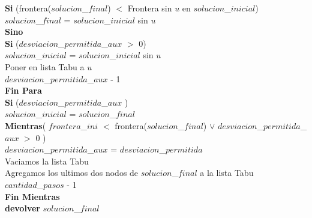 \begin{algorithm}[H]
	\hspace{16mm} \textbf{Si }(frontera($solucion$\_$final$) $<$ Frontera sin $u$ en $solucion$\_$inicial$) \\
	\hspace{20mm} $solucion$\_$final$ = $solucion$\_$inicial$ sin $u$ \\
	\hspace{16mm} \textbf{Sino} \\
	\hspace{20mm} \textbf{Si} ($desviacion$\_$permitida$\_$aux$ $>$ 0) \\
	\hspace{24mm} $solucion$\_$inicial$ = $solucion$\_$inicial$ sin $u$ \\
	\hspace{24mm} Poner en lista Tabu a $u$ \\
	\hspace{24mm} $desviacion$\_$permitida$\_$aux$  - 1 \\
	\hspace{8mm} \textbf{Fin Para} \\
							
	\hspace{8mm} \textbf{Si} ($desviacion$\_$permitida$\_$aux$ ) \\
	\hspace{12mm} $solucion$\_$inicial$ = $solucion$\_$final$ \\
	\hspace{4mm} \textbf{Mientras}( $frontera$\_$ini$ $<$ frontera($solucion$\_$final$)  $\vee$ $desviacion$\_$permitida$\_$aux$ $>$ 0 ) \\
	\hspace{4mm} $desviacion$\_$permitida$\_$aux$ = $desviacion$\_$permitida$  \\
	\hspace{4mm} Vaciamos la lista Tabu \\
	\hspace{4mm} Agregamos los ultimos dos nodos de $solucion$\_$final$ a la lista Tabu \\
	\hspace{4mm} $cantidad$\_$pasos$ - 1 \\
 	\textbf{Fin Mientras} \\
    	\textbf{devolver} $solucion$\_$final$ \\
		
\end{algorithm}

